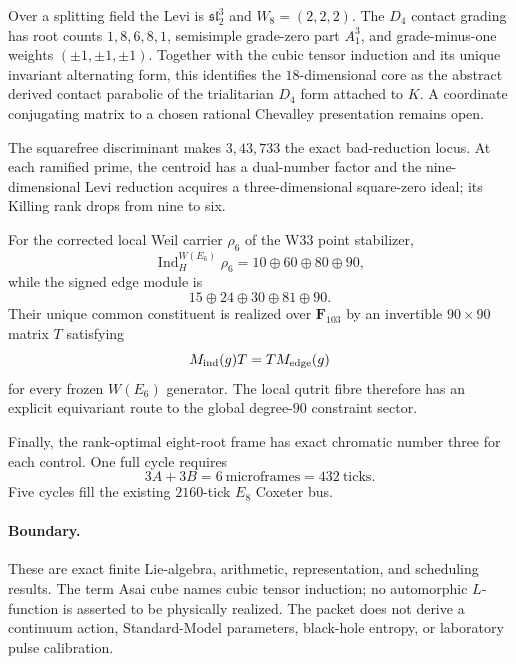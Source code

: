 Over a splitting field the Levi is $\mathfrak{sl}_2^3$ and
$W_8=(2,2,2)$.  The $D_4$ contact grading has root counts
$1,8,6,8,1$, semisimple grade-zero part $A_1^3$, and grade-minus-one
weights $(\pm1,\pm1,\pm1)$.  Together with the cubic tensor induction
and its unique invariant alternating form, this identifies the
$18$-dimensional core as the abstract derived contact parabolic of the
trialitarian $D_4$ form attached to $K$.  A coordinate conjugating matrix to a
chosen rational Chevalley presentation remains open.

The squarefree discriminant makes $3,43,733$ the exact bad-reduction locus.
At each ramified prime, the centroid has a dual-number factor and the
nine-dimensional Levi reduction acquires a three-dimensional square-zero
ideal; its Killing rank drops from nine to six.

For the corrected local Weil carrier $\rho_6$ of the W33 point stabilizer,
\[
\operatorname{Ind}_{H}^{W(E_6)}\rho_6
=10\oplus60\oplus80\oplus90,
\]
while the signed edge module is
\[
15\oplus24\oplus30\oplus81\oplus90.
\]
Their unique common constituent is realized over $\mathbf F_{103}$ by an
invertible $90\times90$ matrix $T$ satisfying
\[
M_{\rm ind}(g)T=T M_{\rm edge}(g)
\]
for every frozen $W(E_6)$ generator.  The local qutrit fibre therefore has an
explicit equivariant route to the global degree-$90$ constraint sector.

Finally, the rank-optimal eight-root frame has exact chromatic number three
for each control.  One full cycle requires
\[
\boxed{3A+3B=6\ \text{microframes}=432\ \text{ticks}}.
\]
Five cycles fill the existing $2160$-tick $E_8$ Coxeter bus.

\paragraph{Boundary.}
These are exact finite Lie-algebra, arithmetic, representation, and scheduling
results.  The term Asai cube names cubic tensor induction; no automorphic
$L$-function is asserted to be physically realized.  The packet does not
derive a continuum action, Standard-Model parameters, black-hole entropy, or
laboratory pulse calibration.
